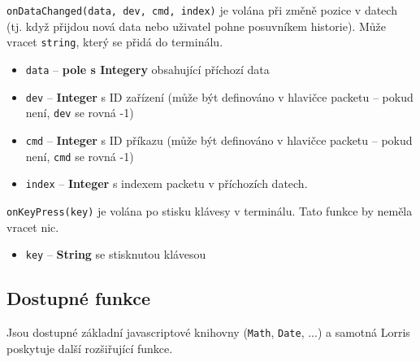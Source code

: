 \documentclass[12pt, a4paper, oneside]{article}
\begin{document}
{\color{blue}\verb/onDataChanged(data, dev, cmd, index)/} je volána při změně pozice v datech (tj. když přijdou nová data nebo uživatel pohne posuvníkem historie). Může vracet \verb/string/, který se přidá do terminálu.

\begin{itemize}
    \item \verb/data/ -- {\bf pole s Integery} obsahující příchozí data
    \item \verb/dev/ -- {\bf Integer} s ID zařízení (může být definováno v hlavičce packetu -- pokud není, \verb/dev/ se rovná -1)
    \item \verb/cmd/ -- {\bf Integer} s ID příkazu (může být definováno v hlavičce packetu -- pokud není, \verb/cmd/ se rovná -1)
    \item \verb/index/ -- {\bf Integer} s indexem packetu v příchozích datech.
\end{itemize}

{\color{blue}\verb/onKeyPress(key)/} je volána po stisku klávesy v terminálu. Tato funkce by neměla vracet nic.
\begin{itemize}
    \item \verb/key/ -- {\bf String} se stisknutou klávesou
\end{itemize}

\subsection*{Dostupné funkce}
Jsou dostupné základní javascriptové knihovny (\verb/Math/, \verb/Date/, ...) a samotná Lorris poskytuje další rozšiřující funkce. 
\end{document}
